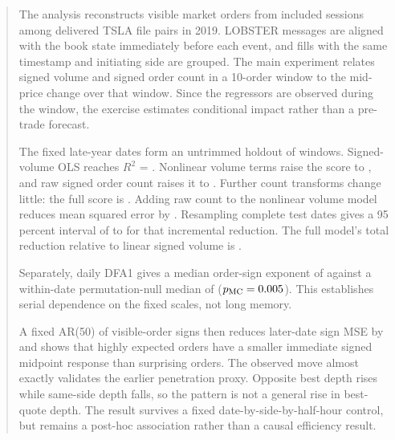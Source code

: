 \documentclass[11pt,a4paper]{article}
\newcommand{\Rtwo}{\ensuremath{R^2}}
\begin{document}
\begin{abstract}
The analysis reconstructs \VisibleOrders{} visible market orders from
\Sessions{} included sessions among \DeliveredSessions{} delivered TSLA file
pairs in 2019. LOBSTER messages are aligned with the book state immediately
before each event, and fills with the same timestamp and initiating side are
grouped. The main experiment relates signed volume and signed order count in a
10-order window to the mid-price change over that window. Since the regressors
are observed during the window, the exercise estimates conditional impact
rather than a pre-trade forecast.

The fixed late-year dates form an untrimmed holdout of \TestObservations{}
windows. Signed-volume OLS reaches \Rtwo{} = \BaselineRtwo{}. Nonlinear volume
terms raise the score to \VolumeRtwo{}, and raw signed order count raises it to
\RawCountRtwo{}. Further count transforms change little: the full score is
\AugmentedRtwo{}. Adding raw count to the nonlinear volume model reduces mean
squared error by \MseReduction{}. Resampling complete test dates gives a 95
percent interval of \BootstrapMseLower{} to \BootstrapMseUpper{} for that
incremental reduction. The full model's total reduction relative to linear
signed volume is \TotalMseReduction{}.

Separately, daily DFA1 gives a median order-sign exponent of
\DfaMedianExponent{} against a within-date permutation-null median of
\DfaNullMedianExponent{} (\(p_{\mathrm{MC}}=\DfaPermutationP{}\)). This
establishes serial dependence on the fixed scales, not long memory.

A fixed AR(50) of visible-order signs then reduces later-date sign MSE by
\SignArMseReduction{} and shows that highly expected orders have a
\MidpointResponseContrast{} smaller immediate signed midpoint response than
surprising orders. The observed move almost exactly validates the earlier
penetration proxy. Opposite best depth rises while same-side depth falls, so
the pattern is not a general rise in best-quote depth. The result survives a
fixed date-by-side-by-half-hour control, but remains a post-hoc association
rather than a causal efficiency result.


\end{abstract}
\end{document}
